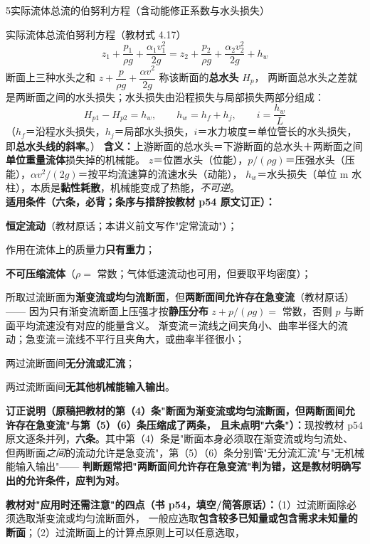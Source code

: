 \begin{kaodian}{5}{实际流体总流的伯努利方程（含动能修正系数与水头损失）}
\begin{gongshi}{实际流体总流伯努利方程（教材式 4.17）}
\[ z_1+\frac{p_1}{\rho g}+\frac{\alpha_1 v_1^2}{2g}=z_2+\frac{p_2}{\rho g}+\frac{\alpha_2 v_2^2}{2g}+h_w \]
断面上三种水头之和 $z+\dfrac{p}{\rho g}+\dfrac{\alpha v^2}{2g}$ 称该断面的\textbf{总水头} $H_p$，
两断面总水头之差就是两断面之间的水头损失；水头损失由沿程损失与局部损失两部分组成：
\[ H_{p1}-H_{p2}=h_w,\qquad h_w=h_f+h_j,\qquad i=\frac{h_w}{L} \]
（$h_f$＝沿程水头损失，$h_j$＝局部水头损失，$i$＝水力坡度＝单位管长的水头损失，即\textbf{总水头线的斜率}。）
\textbf{含义：}上游断面的总水头＝下游断面的总水头＋两断面之间\textbf{单位重量流体}损失掉的机械能。
$z$＝位置水头（位能），$p/(\rho g)$＝压强水头（压能），$\alpha v^2/(2g)$＝按平均流速算的流速水头（动能），
$h_w$＝水头损失（单位 m 水柱），本质是\textbf{黏性耗散}，机械能变成了热能，\emph{不可逆}。\\
\textbf{适用条件（\textbf{六条，必背}；条序与措辞按教材 p54 原文订正）：}
\begin{xiaowen}
  \item \textbf{恒定流动}（教材原话；本讲义前文写作"定常流动"）；
  \item 作用在流体上的质量力\textbf{只有重力}；
  \item \textbf{不可压缩流体}（$\rho=$ 常数；气体低速流动也可用，但要取平均密度）；
  \item 所取过流断面为\textbf{渐变流或均匀流断面}，但\textbf{两断面间允许存在急变流}（教材原话）——
        因为只有渐变流断面上压强才按\textbf{静压分布} $z+p/(\rho g)=$ 常数，否则 $p$ 与断面平均流速没有对应的能量含义。
        渐变流＝流线之间夹角小、曲率半径大的流动；急变流＝流线不平行且夹角大，或曲率半径很小；
  \item 两过流断面间\textbf{无分流或汇流}；
  \item 两过流断面间\textbf{无其他机械能输入输出}。
\end{xiaowen}
\begin{tishi}
\textbf{订正说明（原稿把教材的第（4）条"断面为渐变流或均匀流断面，但两断面间允许存在急变流"与第（5）（6）条压缩成了两条，
且未点明"六条"）：}现按教材 p54 原文逐条并列，\textbf{六条}。其中第（4）条是"断面本身必须取在渐变流或均匀流处、
但两断面\emph{之间}的流动允许是急变流"，第（5）（6）条分别管"无分流汇流"与"无机械能输入输出"——
\textbf{判断题常把"两断面间允许存在急变流"判为错，这是教材明确写出的允许条件，应判为对}。
\end{tishi}
\textbf{教材对"应用时还需注意"的四点（书 p54，填空/简答原话）：}（1）过流断面除必须选取渐变流或均匀流断面外，
一般应选取\textbf{包含较多已知量或包含需求未知量的断面}；（2）过流断面上的计算点原则上可以任意选取，

\end{gongshi}
\end{kaodian}
